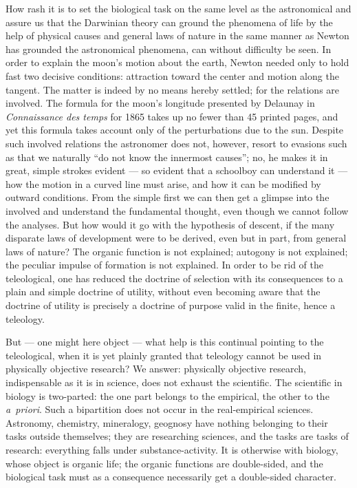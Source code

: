 \documentclass[12pt]{book}
\begin{document}
How rash it is to set the biological task on the same level as the astronomical and assure us
that the Darwinian theory can ground the phenomena of life by the help of physical causes and
general laws of nature in the same manner as Newton has grounded the astronomical phenomena,
can without difficulty be seen. In order to explain the moon's motion about the earth, Newton
needed only to hold fast two decisive conditions: attraction toward the center and motion
along the tangent. The matter is indeed by no means hereby settled; for the relations are
involved. The formula for the moon's longitude presented by Delaunay in \textit{Connaissance
des temps} for 1865 takes up no fewer than 45 printed pages, and yet this formula takes
account only of the perturbations due to the sun. Despite such involved relations the
astronomer does not, however, resort to evasions such as that we naturally ``do not know the
innermost causes''; no, he makes it in great, simple strokes evident --- so evident that a
schoolboy can understand it --- how the motion in a curved line must arise, and how it can be
modified by outward conditions. From the simple first we can then get a glimpse into the
involved and understand the fundamental thought, even though we cannot follow the analyses.
But how would it go with the hypothesis of descent, if the many disparate laws of development
were to be derived, even but in part, from general laws of nature? The organic function is not
explained; autogony is not explained; the peculiar impulse of formation is not explained. In
order to be rid of the teleological, one has reduced the doctrine of selection with its
consequences to a plain and simple doctrine of utility, without even becoming aware that the
doctrine of utility is precisely a doctrine of purpose valid in the finite, hence a teleology.

But --- one might here object --- what help is this continual pointing to the teleological,
when it is yet plainly granted that teleology cannot be used in physically objective research?
We answer: physically objective research, indispensable as it is in science, does not exhaust
the scientific. The scientific in biology is two-parted: the one part belongs to the
empirical, the other to the \textit{a~priori}. Such a bipartition does not occur in the
real-empirical sciences. Astronomy, chemistry, mineralogy, geognosy have nothing belonging to
their tasks outside themselves; they are researching sciences, and the tasks are tasks of
research: everything falls under substance-activity. It is otherwise with biology, whose
object is organic life; the organic functions are double-sided, and the biological task must
as a consequence necessarily get a double-sided character.
\end{document}
